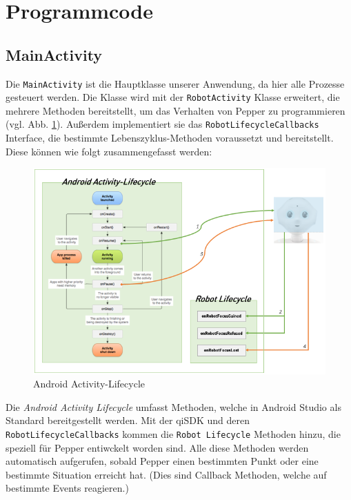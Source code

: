 \section{Programmcode}

\subsection{MainActivity}

Die \verb|MainActivity| ist die Hauptklasse unserer Anwendung, da hier alle Prozesse gesteuert werden. Die Klasse wird mit der \verb|RobotActivity| Klasse erweitert, die mehrere Methoden bereitstellt, um das Verhalten von Pepper zu programmieren (vgl. Abb. \ref{fig:AAL}). Außerdem implementiert sie das \verb|RobotLifecycleCallbacks| Interface, die bestimmte Lebenszyklus-Methoden voraussetzt 
und bereitstellt. Diese können wie folgt zusammengefasst werden:\\

\begin{figure}[H]
    \includegraphics[width=\textwidth]{Figures/AppChapter/4_1_3.png}
    \caption{Android Activity-Lifecycle \cite{AALife}}
    \label{fig:AAL}
    \centering
\end{figure}

Die \textit{Android Activity Lifecycle} umfasst Methoden, welche in Android Studio als Standard bereitgestellt werden. Mit der qiSDK und deren \verb|RobotLifecycleCallbacks| kommen die \verb|Robot Lifecycle| Methoden hinzu, die speziell für Pepper entiwckelt worden sind. Alle diese Methoden werden automatisch aufgerufen, sobald Pepper einen bestimmten Punkt oder eine bestimmte Situation erreicht hat. (Dies sind Callback Methoden, welche auf bestimmte Events reagieren.)

